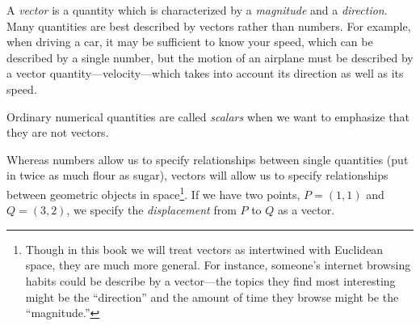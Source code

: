 A \emph{vector} is a quantity which is characterized by
a \emph{magnitude} and a \emph{direction}.   Many quantities are best
described by vectors rather than
numbers.  For example, when driving a car,
 it may be sufficient to
know your speed, which can be described by a single number,
 but the motion of an airplane must be described
by a vector quantity---velocity---which takes into account its
direction as well as its speed.

Ordinary numerical quantities are called \emph{scalars}
when we want to emphasize that they are not vectors.

Whereas numbers allow us to specify relationships between single quantities
(put in twice as much flour as sugar), vectors will allow us to specify
relationships between geometric objects in space\footnote{
	Though in this book we will treat vectors as intertwined with Euclidean
	space, they are much more general.  For instance, someone's internet
	browsing habits could be describe by a vector---the topics they
	find most interesting might be the ``direction'' and the amount
	of time they browse might be the ``magnitude.''
}.  If we have two points, $P=(1,1)$ and $Q=(3,2)$, we specify the
\emph{displacement} from $P$ to $Q$ as a vector.

\begin{center}
	\usetikzlibrary{patterns,decorations.pathreplacing}
\end{center}


